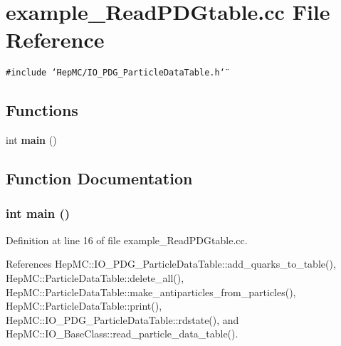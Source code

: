 \section{example\_\-Read\-PDGtable.cc File Reference}
\label{example__ReadPDGtable_8cc}
{\tt \#include \char`\"{}Hep\-MC/IO\_\-PDG\_\-Particle\-Data\-Table.h\char`\"{}}\par
\subsection*{Functions}
\begin{CompactItemize}
\item 
int {\bf main} ()
\end{CompactItemize}


\subsection{Function Documentation}
\subsubsection{\setlength{\rightskip}{0pt plus 5cm}int main ()}\label{example__ReadPDGtable_8cc_e66f6b31b5ad750f1fe042a706a4e3d4}




Definition at line 16 of file example\_\-Read\-PDGtable.cc.

References Hep\-MC::IO\_\-PDG\_\-Particle\-Data\-Table::add\_\-quarks\_\-to\_\-table(), Hep\-MC::Particle\-Data\-Table::delete\_\-all(), Hep\-MC::Particle\-Data\-Table::make\_\-antiparticles\_\-from\_\-particles(), Hep\-MC::Particle\-Data\-Table::print(), Hep\-MC::IO\_\-PDG\_\-Particle\-Data\-Table::rdstate(), and Hep\-MC::IO\_\-Base\-Class::read\_\-particle\_\-data\_\-table().